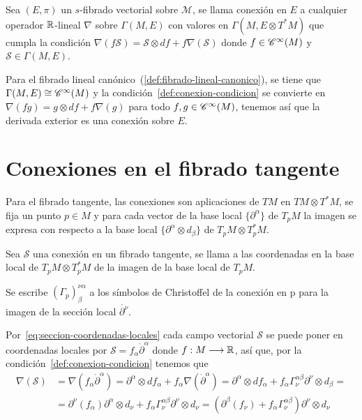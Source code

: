 \begin{definition}
  Sea $(E, \pi)$ un $s$-fibrado vectorial sobre $\mathcal{M}$, se llama conexión en $E$ a cualquier operador $\mathbb{R}$-lineal
  $\nabla$ sobre $\Gamma(M, E)$ con valores en $\Gamma(M, E\otimes T^* M)$ que cumpla la condición $\nabla(f\mathcal{S})
  =\mathcal{S}\otimes df+f\nabla(\mathcal{S})$\label{def:conexion-condicion} donde $f\in\mathscr{C}^\infty(M)$ y
  $\mathcal{S}\in\Gamma(M, E)$.
\end{definition}

Para el fibrado lineal canónico~(\ref{def:fibrado-lineal-canonico}), se tiene que $\Gamma(M, E)
\cong\mathscr{C}^\infty(M)$ y la condición~\ref{def:conexion-condicion} se convierte en $\nabla(fg)=g\otimes df+f\nabla(g)$
para todo $f,g\in\mathscr{C}^\infty(M)$, tenemos así que la derivada exterior es una conexión sobre $E$.


\section{Conexiones en el fibrado tangente}

Para el fibrado tangente, las conexiones son aplicaciones de $TM$ en $TM\otimes T^*M$, se fija un punto $p\in
M$ y para cada vector de la base local $\{\partial^\alpha\}$ de $T_p M$ la imagen se expresa con respecto a la
base local $\{\partial^\alpha\otimes d_\beta\}$ de $T_pM\otimes T_p^*M$.

\begin{definition}
  Sea $\mathcal{S}$ una conexión en un fibrado tangente, se llama  a las coordenadas en la base local de $T_pM\otimes T_p^*M$ de la imagen
  de la base local de $T_pM$.
\end{definition}
\begin{notation}
  Se escribe $(\Gamma_p)_\beta^{\nu\alpha}$ a los símbolos de Christoffel de la conexión en p para la imagen de la
  sección local $\mathring{\partial^\nu}$.
\end{notation}

Por~\ref{eq:seccion-coordenadas-locales} cada campo vectorial $\mathcal{S}$ se
puede poner en coordenadas locales por $\mathcal{S}=f_\alpha\mathring{\partial}^\alpha$ donde $f:M\longrightarrow \mathbb{R}$, así
que, por la condición~\ref{def:conexion-condicion} tenemos que
\begin{equation*}
  \begin{split}
    \nabla(\mathcal{S}) &=\nabla(f_\alpha
    \mathring{\partial}^\alpha)=\partial^\alpha\otimes df_\alpha+f_\alpha\nabla(\mathring{\partial}^\alpha)=
    \partial^\alpha\otimes df_\alpha+f_\alpha\Gamma_\nu^{\alpha\beta}\partial^\nu\otimes d_\beta=\\
    & = \partial^\nu(f_\alpha)\partial^\alpha\otimes d_\nu+f_\alpha\Gamma_\nu^{\alpha\beta}
    \partial^\nu\otimes d_\nu=(\partial^\beta(f_\nu)+f_\alpha\Gamma_\nu^{\alpha\beta})
    \partial^\nu\otimes d_\nu
  \end{split}
\end{equation*}

